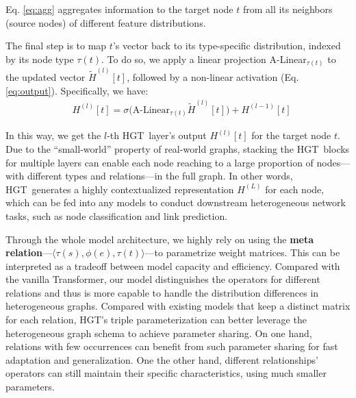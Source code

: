 \documentclass[sigconf]{acmart}
\theoremstyle{definition}
\newcommand{\short}{HGT}
\begin{document}
{Eq. \ref{eq:agg} aggregates information to the target node $t$ from all its neighbors (source nodes) of different feature distributions. 

The final step is to map $t$'s vector back to its type-specific distribution, indexed by its node type $\tau(t)$. 
To do so, we apply a linear projection A-Linear$_{\tau(t)}$ to the updated vector $\widetilde{H}^{(l)}[t]$, followed by a non-linear activation (Eq. \ref{eq:output}). Specifically, we have: 
\begin{align}
&H^{(l)}[t] =  \sigma\Big(\text{A-Linear}_{\tau(t)}\widetilde{H}^{(l)}[t]\Big)
 + H^{(l-1)}[t] \label{eq:output}
\end{align}



In this way, we get the $l$-th \short\ layer's output $H^{(l)}[t]$ for the target node $t$. 
Due to the ``small-world'' property of real-world graphs, stacking the \short\ blocks for multiple layers can enable each node reaching to a large proportion of nodes---with different types and relations---in the full graph. 
In other words, \short\ generates a highly contextualized representation $H^{(L)}$ for each node, which can be fed into any models to conduct downstream heterogeneous network tasks, such as node classification and link prediction. 

Through the whole model architecture, we highly rely on using the \textbf{meta relation}---$\langle \tau(s), \phi(e), \tau(t) \rangle$---to parametrize weight matrices. This can be interpreted as a tradeoff between model capacity and efficiency. Compared with the vanilla Transformer, our model distinguishes the operators for different relations and thus is more capable to handle the distribution differences in heterogeneous graphs. 
Compared with existing models that keep a distinct matrix for each relation, \short's triple parameterization can better leverage the heterogeneous graph schema to achieve parameter sharing. On one hand, relations with few occurrences can benefit from such parameter sharing for fast adaptation and generalization. One the other hand, different relationships' operators can still maintain their specific characteristics, using much smaller parameters. 

}

 
\end{document}
